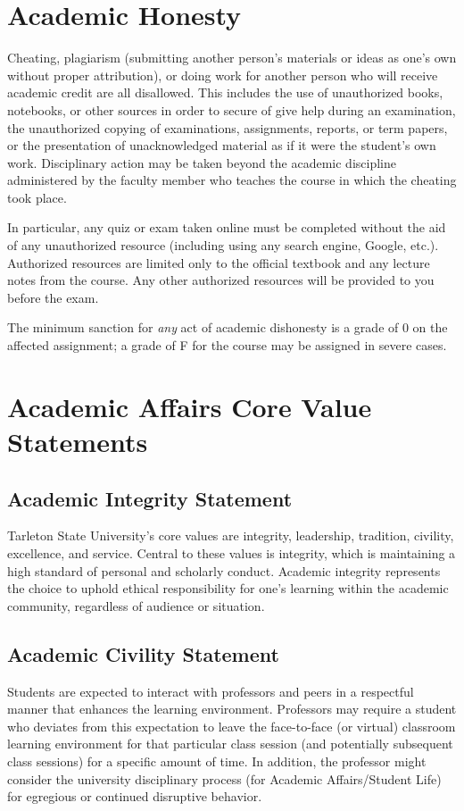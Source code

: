\documentclass[10pt]{article}
\begin{document}
\section*{Academic Honesty}
\label{sec-8}

Cheating, plagiarism (submitting another person’s materials or ideas as one’s own without proper attribution), or doing work for another person who will receive academic credit are all disallowed. This includes the use of unauthorized books, notebooks, or other sources in order to secure of give help during an examination, the unauthorized copying of examinations, assignments, reports, or term papers, or the presentation of unacknowledged material as if it were the student’s own work. Disciplinary action may be taken beyond the academic discipline administered by the faculty member who teaches the course in which the cheating took place.

In particular, any quiz or exam taken online must be completed without the aid of any unauthorized resource (including using any search engine, Google, etc.).  Authorized resources are limited only to the official textbook and any lecture notes from the course.  Any other authorized resources will be provided to you before the exam.  

The minimum sanction for \emph{any} act of academic dishonesty is a grade of 0 on the affected assignment; a grade of F for the course may be assigned in severe cases.

\section*{Academic Affairs Core Value Statements}
\label{sec-9}

\subsection*{Academic Integrity Statement}
\label{sec-9-1}
Tarleton State University's core values are integrity, leadership, tradition, civility, excellence, and service.  Central to these values is integrity, which is maintaining a high standard of personal and scholarly conduct.  Academic integrity represents the choice to uphold ethical responsibility for one’s learning within the academic community, regardless of audience or situation.

\subsection*{Academic Civility Statement}
\label{sec-9-2}
Students are expected to interact with professors and peers in a respectful manner that enhances the learning environment. Professors may require a student who deviates from this expectation to leave the face-to-face (or virtual) classroom learning environment for that particular class session (and potentially subsequent class sessions) for a specific amount of time. In addition, the professor might consider the university disciplinary process (for Academic Affairs/Student Life) for egregious or continued disruptive behavior.
\end{document}
